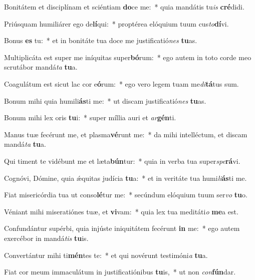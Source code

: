 \item Bonitátem et disciplínam et sciéntiam \textbf{do}ce me:~* quia mandátis tu\textit{is} \textbf{cré}didi.
\item Priúsquam humiliárer ego de\textbf{lí}qui:~* proptérea elóquium tuum cus\textit{to}\textbf{dí}vi.
\item Bonus \textbf{es} tu:~* et in bonitáte tua doce me justificatió\textit{nes} \textbf{tu}as.
\item Multiplicáta est super me iníquitas super\textbf{bó}rum:~* ego autem in toto corde meo scrutábor mandá\textit{ta} \textbf{tu}a.
\item Coagulátum est sicut lac cor e\textbf{ó}rum:~* ego vero legem tuam me\textit{di}\textbf{tá}tus sum.
\item Bonum mihi quia humili\textbf{ás}ti me:~* ut discam justificatió\textit{nes} \textbf{tu}as.
\item Bonum mihi lex oris \textbf{tu}i:~* super míllia auri et \textit{ar}\textbf{gén}ti.
\item Manus tuæ fecérunt me, et plasma\textbf{vé}runt me:~* da mihi intelléctum, et discam mandá\textit{ta} \textbf{tu}a.
\item Qui timent te vidébunt me et læta\textbf{bún}tur:~* quia in verba tua super\textit{spe}\textbf{rá}vi.
\item Cognóvi, Dómine, quia ǽquitas judícia \textbf{tu}a:~* et in veritáte tua humi\textit{li}\textbf{ás}ti me.
\item Fiat misericórdia tua ut conso\textbf{lé}tur me:~* secúndum elóquium tuum ser\textit{vo} \textbf{tu}o.
\item Véniant mihi miseratiónes tuæ, et \textbf{vi}vam:~* quia lex tua meditáti\textit{o} \textbf{me}a est.
\item Confundántur supérbi, quia injúste iniquitátem fecérunt \textbf{in} me:~* ego autem exercébor in mandá\textit{tis} \textbf{tu}is.
\item Convertántur mihi ti\textbf{mén}tes te:~* et qui novérunt testimóni\textit{a} \textbf{tu}a.
\item Fiat cor meum immaculátum in justificatiónibus \textbf{tu}is,~* ut non \textit{con}\textbf{fún}dar.
